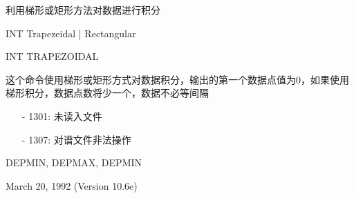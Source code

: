 \label{cmd:int}

利用梯形或矩形方法对数据进行积分

INT Trapezeidal | Rectangular

INT TRAPEZOIDAL

这个命令使用梯形或矩形方式对数据积分，输出的第一个数据点值为0，如果使用梯形积分，数据点数将少一个，数据不必等间隔

\begin{itemize}
\item[-]1301: 未读入文件
\item[-]1307: 对谱文件非法操作
\end{itemize}

DEPMIN, DEPMAX, DEPMIN

March 20, 1992 (Version 10.6e)
